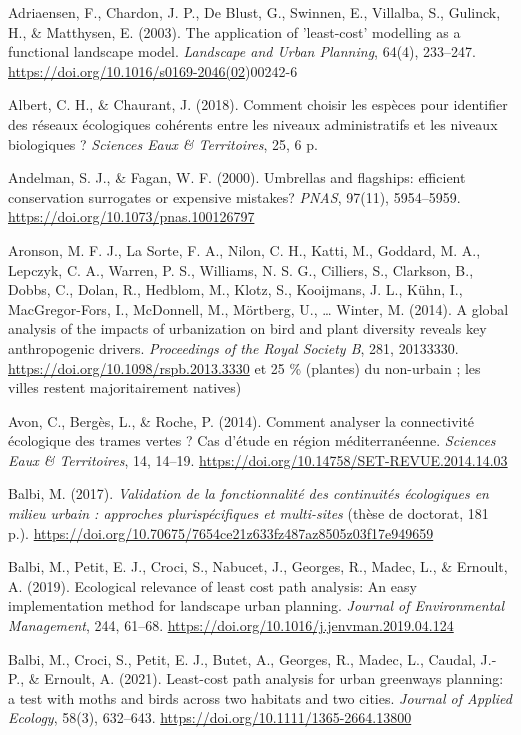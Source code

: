 \documentclass[a4paper,11pt]{report}
\begin{document}
Adriaensen, F., Chardon, J. P., De Blust, G., Swinnen, E., Villalba, S., Gulinck, H., \& Matthysen, E. (2003). The application of 'least-cost' modelling as a functional landscape model. \textit{Landscape and Urban Planning}, 64(4), 233--247. \url{https://doi.org/10.1016/s0169-2046(02})00242-6

Albert, C. H., \& Chaurant, J. (2018). Comment choisir les espèces pour identifier des réseaux écologiques cohérents entre les niveaux administratifs et les niveaux biologiques ? \textit{Sciences Eaux \& Territoires}, 25, 6 p.

Andelman, S. J., \& Fagan, W. F. (2000). Umbrellas and flagships: efficient conservation surrogates or expensive mistakes? \textit{PNAS}, 97(11), 5954--5959. \url{https://doi.org/10.1073/pnas.100126797}

Aronson, M. F. J., La Sorte, F. A., Nilon, C. H., Katti, M., Goddard, M. A., Lepczyk, C. A., Warren, P. S., Williams, N. S. G., Cilliers, S., Clarkson, B., Dobbs, C., Dolan, R., Hedblom, M., Klotz, S., Kooijmans, J. L., Kühn, I., MacGregor-Fors, I., McDonnell, M., Mörtberg, U., \ldots{} Winter, M. (2014). A global analysis of the impacts of urbanization on bird and plant diversity reveals key anthropogenic drivers. \textit{Proceedings of the Royal Society B}, 281, 20133330. \url{https://doi.org/10.1098/rspb.2013.3330} et 25 \% (plantes) du non-urbain ; les villes restent majoritairement natives)

Avon, C., Bergès, L., \& Roche, P. (2014). Comment analyser la connectivité écologique des trames vertes ? Cas d'étude en région méditerranéenne. \textit{Sciences Eaux \& Territoires}, 14, 14--19. \url{https://doi.org/10.14758/SET-REVUE.2014.14.03}

Balbi, M. (2017). \textit{Validation de la fonctionnalité des continuités écologiques en milieu urbain : approches plurispécifiques et multi-sites} (thèse de doctorat, 181 p.). \url{https://doi.org/10.70675/7654ce21z633fz487az8505z03f17e949659}

Balbi, M., Petit, E. J., Croci, S., Nabucet, J., Georges, R., Madec, L., \& Ernoult, A. (2019). Ecological relevance of least cost path analysis: An easy implementation method for landscape urban planning. \textit{Journal of Environmental Management}, 244, 61--68. \url{https://doi.org/10.1016/j.jenvman.2019.04.124}

Balbi, M., Croci, S., Petit, E. J., Butet, A., Georges, R., Madec, L., Caudal, J.-P., \& Ernoult, A. (2021). Least-cost path analysis for urban greenways planning: a test with moths and birds across two habitats and two cities. \textit{Journal of Applied Ecology}, 58(3), 632--643. \url{https://doi.org/10.1111/1365-2664.13800}
\end{document}

